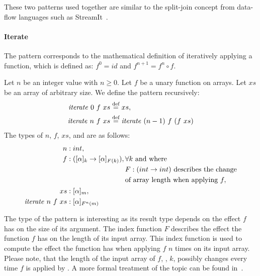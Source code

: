 These two patterns used together are similar to the split-join concept from data-flow languages such as StreamIt~\cite{ThiesKaAm2002}.


\paragraph{Iterate}
The \iterateN pattern corresponds to the mathematical definition of iteratively applying a function, which is defined as: {$f^0 = id$} and {$f^{n+1} = f^n \circ f$}.

\begin{definition}
  \label{definition:pattern:iterate}
  Let $n$ be an integer value with $n \geq 0$.
  Let $f$ be a unary function on arrays.
  Let $xs$ be an array of arbitrary size.
  We define the \iterateN pattern recursively:
  \begin{align*}
    \text{\textit{iterate}}\ 0\ f\ xs &\stackrel{\textrm{\scriptsize def}}{=} xs,\\
    \text{\textit{iterate}}\ n\ f\ xs &\stackrel{\textrm{\scriptsize def}}{=} \text{\textit{iterate}}\ (n-1)\ f\ (f\ xs)
  \end{align*}
  The types of $n$, $f$, $xs$, and \iterateN are as follows:
  \begin{align*}
    n &: int,\\
    f &: ([\alpha]_k \rightarrow [\alpha]_{F(k)}),
      \begin{aligned}[t]
        & \forall k \text{ and where } \\
        &F : (int\rightarrow int) \text{ describes the change}\\
        &\text{of array length when applying } f,
      \end{aligned}\\
    xs &: [\alpha]_m,\\
    \text{\textit{iterate}}\ n\ f\ xs &: [\alpha]_{F^n(m)}
  \end{align*}
\end{definition}


\noindent
The type of the \iterateN pattern is interesting as its result type depends on the effect $f$ has on the size of its argument.
The index function $F$ describes the effect the function $f$ has on the length of its input array.
This index function is used to compute the effect the \iterateN function has when applying $f$ $n$ times on its input array.
Please note, that the length of the input array of $f$, \ie, $k$, possibly changes every time $f$ is applied by \iterateN.
A more formal treatment of the topic can be found in~\cite{SteuwerFeLiDu2015}.

